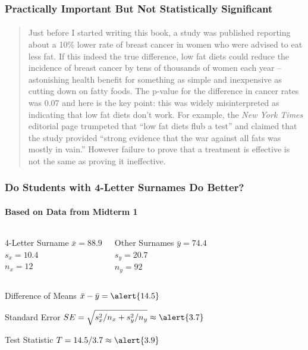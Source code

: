 \documentclass[handout]{beamer}
\begin{document}
\begin{frame}
\frametitle{Practically Important But Not Statistically Significant}
\framesubtitle{\href{http://www.amazon.com/p-value-Stories-Actually-Understand-Statistics/dp/0321629302}{}}
\footnotesize
\begin{quote}
Just before I started writing this book, a study was published reporting about a 10\% lower rate of breast cancer in women who were advised to eat less fat. If this indeed the true difference, low fat diets could reduce the incidence of breast cancer by tens of thousands of women each year -- astonishing health benefit for something as simple and inexpensive as cutting down on fatty foods. The p-value for the difference in cancer rates was 0.07 and here is the key point: this was widely misinterpreted as indicating that low fat diets don't work. For example, the \emph{New York Times} editorial page trumpeted that ``low fat diets flub a test'' and claimed that the study provided ``strong evidence that the war against all fats was mostly in vain.'' \alert{However failure to prove that a treatment is effective is not the same as proving it ineffective.}
\end{quote}
\end{frame}
\begin{frame}[c]\frametitle{Do Students with 4-Letter Surnames Do Better?}
 \framesubtitle{Based on Data from Midterm 1}
    \begin{columns}
    	 \begin{block}
    		{4-Letter Surname}
    			$\bar{x} = 88.9$\\
    			$s_x = 10.4$\\
    			$n_x = 12$
    	\end{block} 
    	 \begin{block}
    		{Other Surnames}
    			$\bar{y} = 74.4$\\
    			$s_y = 20.7$\\
    			$n_y = 92$
    	\end{block}
    \end{columns}

\vspace{1em}
\begin{block}
	{Difference of Means}
	$\bar{x} - \bar{y} = \alert{14.5}$
\end{block}
\begin{block}
	{Standard Error}
	$\displaystyle SE = \sqrt{s_x^2/n_x + s_y^2/n_y} \approx \alert{3.7}$
\end{block}
\begin{block}
	{Test Statistic}
	$T = 14.5 / 3.7 \approx \alert{3.9}$
\end{block}
\end{frame}
\end{document}
